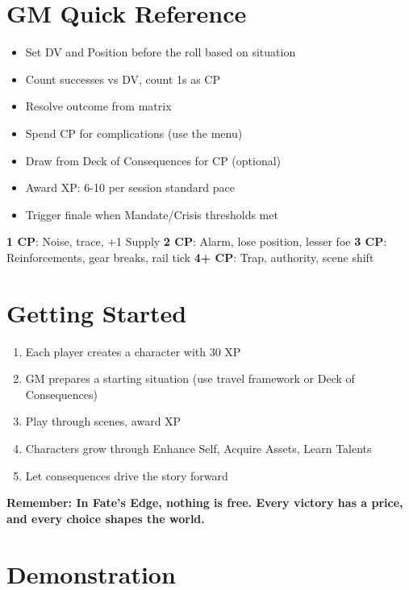 \documentclass[11pt]{article}
\begin{document}
\section{GM Quick Reference}

\begin{itemize}
    \item Set DV and Position before the roll based on situation
    \item Count successes vs DV, count 1s as CP
    \item Resolve outcome from matrix
    \item Spend CP for complications (use the menu)
    \item Draw from Deck of Consequences for CP (optional)
    \item Award XP: 6-10 per session standard pace
    \item Trigger finale when Mandate/Crisis thresholds met
\end{itemize}

\begin{fatebox}
\textbf{1 CP}: Noise, trace, +1 Supply
\textbf{2 CP}: Alarm, lose position, lesser foe
\textbf{3 CP}: Reinforcements, gear breaks, rail tick  
\textbf{4+ CP}: Trap, authority, scene shift
\end{fatebox}

\section{Getting Started}

\begin{enumerate}
    \item Each player creates a character with 30 XP
    \item GM prepares a starting situation (use travel framework or Deck of Consequences)
    \item Play through scenes, award XP
    \item Characters grow through Enhance Self, Acquire Assets, Learn Talents
    \item Let consequences drive the story forward
\end{enumerate}

\begin{center}
\textbf{Remember: In Fate's Edge, nothing is free. Every victory has a price, and every choice shapes the world.}
\end{center}

\section{Demonstration}
\end{document}
